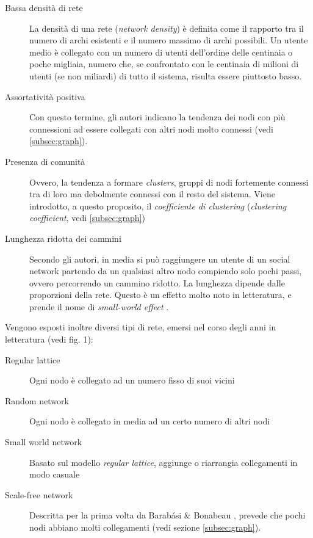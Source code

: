 \documentclass[a4paper,12pt]{article}
\begin{document}
\begin{description}
\item[Bassa densità di rete] La densità di una rete \cite{gilbert} (\textit{network density}) è definita come il rapporto tra il numero di archi esistenti e il numero massimo di archi possibili. Un utente medio è collegato con un numero di utenti dell'ordine delle centinaia o poche migliaia, numero che, se confrontato con le centinaia di milioni di utenti (se non miliardi) di tutto il sistema, risulta essere piuttosto basso. 
\item[Assortatività positiva] Con questo termine, gli autori indicano la tendenza dei nodi con più connessioni ad essere collegati con altri nodi molto connessi (vedi \ref{subsec:graph}). 
\item[Presenza di comunità] Ovvero, la tendenza a formare \textit{clusters}, gruppi di nodi fortemente connessi tra di loro ma debolmente connessi con il resto del sistema. Viene introdotto, a questo proposito, il \textit{coefficiente di clustering} (\textit{clustering coefficient}, vedi  \ref{subsec:graph}) 
\item[Lunghezza ridotta dei cammini] Secondo gli autori, in media si può raggiungere un utente di un social network partendo da un qualsiasi altro nodo compiendo solo pochi passi, ovvero percorrendo un cammino ridotto. La lunghezza dipende dalle proporzioni della rete. Questo è un effetto molto noto in letteratura, e prende il nome di \textit{small-world effect} \cite{barabasi}\cite{newman}.
\end{description}
Vengono esposti inoltre diversi tipi di rete, emersi nel corso degli anni in letteratura (vedi fig. 1):
\begin{description}
\item[Regular lattice] Ogni nodo è collegato ad un numero fisso di suoi vicini
\item[Random network] Ogni nodo è collegato in media ad un certo numero di altri nodi
\item[Small world network] Basato sul modello \textit{regular lattice}, aggiunge o riarrangia collegamenti in modo casuale
\item[Scale-free network] Descritta per la prima volta da Barabási \& Bonabeau \cite{scalefree}, prevede che pochi nodi abbiano molti collegamenti (vedi sezione \ref{subsec:graph}).
\end{description}
\end{document}
